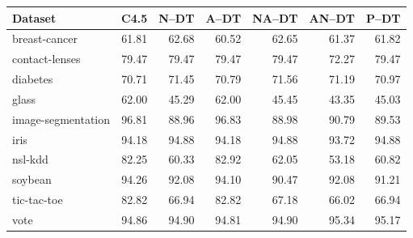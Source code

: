 \begin{tabular}{lrrrrrr}
\toprule
Dataset & C4.5 & N--DT & A--DT & NA--DT & AN--DT & P--DT \\
\midrule
breast-cancer & 61.81 & 62.68 & 60.52 & 62.65 & 61.37 & 61.82 \\
contact-lenses & 79.47 & 79.47 & 79.47 & 79.47 & 72.27 & 79.47 \\
diabetes & 70.71 & 71.45 & 70.79 & 71.56 & 71.19 & 70.97 \\
glass & 62.00 & 45.29 & 62.00 & 45.45 & 43.35 & 45.03 \\
image-segmentation & 96.81 & 88.96 & 96.83 & 88.98 & 90.79 & 89.53 \\
iris & 94.18 & 94.88 & 94.18 & 94.88 & 93.72 & 94.88 \\
nsl-kdd & 82.25 & 60.33 & 82.92 & 62.05 & 53.18 & 60.82 \\
soybean & 94.26 & 92.08 & 94.10 & 90.47 & 92.08 & 91.21 \\
tic-tac-toe & 82.82 & 66.94 & 82.82 & 67.18 & 66.02 & 66.94 \\
vote & 94.86 & 94.90 & 94.81 & 94.90 & 95.34 & 95.17 \\
\bottomrule
\end{tabular}
